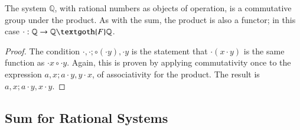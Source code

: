 \documentclass [12pt]{book}
\begin{document}
\begin{theorem}The system $\mathbb Q$, with rational numbers as objects of operation, is a commutative group under the product. As with the sum, the product is also a functor; in this case $\cdot:\mathbb{Q}\rightarrow\mathbb{Q}\textgoth{F}\mathbb{Q}$.\end{theorem}\begin{proof}The condition $\cdot,\cdot;\circ(\cdot y),\cdot y$ is the statement that $\cdot(x\cdot y)$ is the same function as $\cdot x\circ\cdot y$. Again, this is proven by applying commutativity once to the expression $a,x;a\cdot y,y\cdot x$, of associativity for the product. The result is $a,x;a\cdot y,x\cdot y$.\end{proof}

	\subsection{Sum for Rational Systems}
\end{document}
